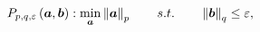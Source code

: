\begin{equation} %
\label{eq:Opt-Lp}
\mycolor{P_{p,q,\varepsilon} \myparanthese{\boldsymbol{a},\boldsymbol{b}} : \min_{\boldsymbol{a}} \mynorm{\boldsymbol{a}}_p \qquad s.t. \qquad \mynorm{\boldsymbol{b}}_q \leq \varepsilon,}
\end{equation}